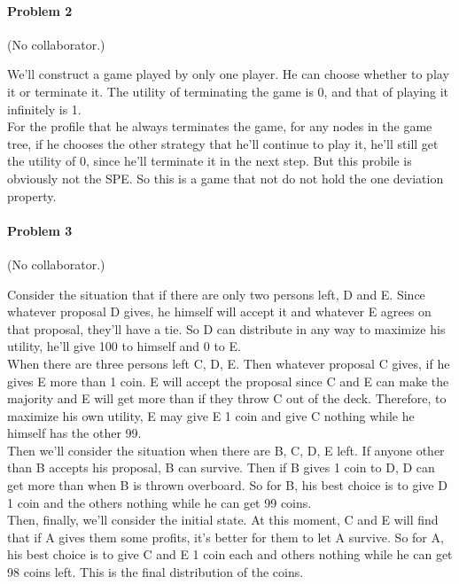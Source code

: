 \documentclass[12pt]{article}
\begin{document}
\bigskip

\paragraph{Problem 2} (No collaborator.)

We'll construct a game played by only one player.
He can choose whether to play it or terminate it.
The utility of terminating the game is 0, and that of playing it infinitely is 1. \\
For the profile that he always terminates the game,
for any nodes in the game tree, if he chooses the other strategy that he'll continue to play it, 
he'll still get the utility of 0, since he'll terminate it in the next step.
But this probile is obviously not the SPE.
So this is a game that not do not hold the one deviation property.


\bigskip

\paragraph{Problem 3} (No collaborator.)

Consider the situation that if there are only two persons left, D and E. 
Since whatever proposal D gives, he himself will accept it and whatever E agrees on that proposal, they'll have a tie. 
So D can distribute in any way to maximize his utility,
he'll give 100 to himself and 0 to E. \\
When there are three persons left C, D, E.
Then whatever proposal C gives, if he gives E more than 1 coin.
E will accept the proposal since C and E can make the majority and E will get more than if they throw C out of the deck.
Therefore, to maximize his own utility, 
E may give E 1 coin and give C nothing while he himself has the other 99.  \\
Then we'll consider the situation when there are B, C, D, E left.
If anyone other than B accepts his proposal, B can survive.
Then if B gives 1 coin to D, D can get more than when B is thrown overboard.
So for B, his best choice is to give D 1 coin and the others nothing while he can get 99 coins. \\
Then, finally, we'll consider the initial state.
At this moment, C and E will find that if A gives them some profits, 
it's better for them to let A survive.
So for A, his best choice is to give C and E 1 coin each and others nothing while he can get 98 coins left.
This is the final distribution of the coins.



\begin{thebibliography}{99}




\end{thebibliography}
\end{document}
